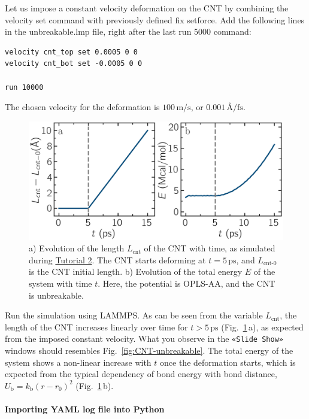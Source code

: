 \documentclass[9pt,tutorial]{livecoms}
\newcommand{\lmpcmd}[1]{\colorbox{listing}{\textcolor{command}{\small{#1}}}} %
\newcommand{\guicmd}[1]{\textcolor{command}{\texttt{«#1»}}} %
\begin{document}
Let us impose a constant velocity deformation on the CNT
by combining the \lmpcmd{velocity set} command with previously defined
\lmpcmd{fix setforce}.  Add the following lines in the \lmpcmd{unbreakable.lmp}
file, right after the last \lmpcmd{run 5000} command:
\begin{lstlisting}
velocity cnt_top set 0.0005 0 0
velocity cnt_bot set -0.0005 0 0

run 10000
\end{lstlisting}
The chosen velocity for the deformation is $100\,\text{m/s}$, or
$0.001\,\text{\AA{}/fs}$.

\begin{figure}
\centering
\includegraphics[width=\linewidth]{CNT-unbreakable-length-energy}
\caption{a) Evolution of the length $L_\text{cnt}$ of the CNT with time,
as simulated during \hyperref[carbon-nanotube-label]{Tutorial 2}.
The CNT starts deforming at $t = 5\,\text{ps}$, and $L_\text{cnt-0}$ is the
CNT initial length.  b) Evolution of the total energy $E$ of the system
with time $t$.  Here, the potential is OPLS-AA, and the CNT is unbreakable.}
\label{fig:CNT-unbreakable-LE}
\end{figure}

Run the simulation using LAMMPS.  As can be seen from the variable $L_\text{cnt}$, the length
of the CNT increases linearly over time for $t > 5\,\text{ps}$ (Fig.~\ref{fig:CNT-unbreakable-LE}\,a),
as expected from the imposed constant velocity.  What you observe in the \guicmd{Slide Show}
windows should resembles Fig.~\ref{fig:CNT-unbreakable}.  The total energy of the system
shows a non-linear increase with $t$ once the deformation starts, which is expected
from the typical dependency of bond energy with bond distance,
$U_\text{b} = k_\text{b} \left( r - r_0 \right)^2$ (Fig.~\ref{fig:CNT-unbreakable-LE}\,b).

\paragraph{Importing YAML log file into Python}
\end{document}
